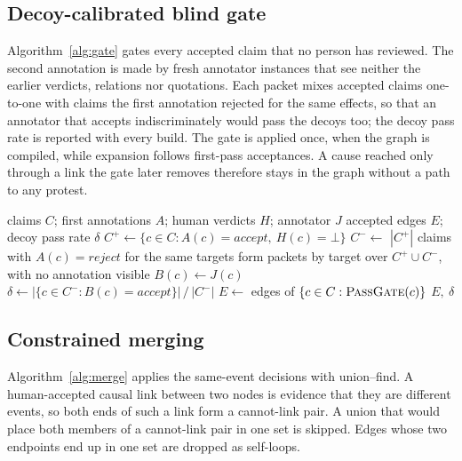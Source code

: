 \documentclass[pdflatex,sn-basic,lineno]{sn-jnl}
\theoremstyle{thmstylethree}
\theoremstyle{thmstyleone}
\begin{document}
\subsection{Decoy-calibrated blind gate}
Algorithm~\ref{alg:gate} gates every accepted claim that no person has reviewed. The second
annotation is made by fresh annotator instances that see neither the earlier verdicts, relations
nor quotations. Each packet mixes accepted claims one-to-one with claims the first annotation
rejected for the same effects, so that an annotator that accepts indiscriminately would pass the
decoys too; the decoy pass rate is reported with every build. The
gate is applied once, when the graph is compiled, while expansion follows first-pass acceptances.
A cause reached only through a link the gate later removes therefore stays in the graph without a
path to any protest.

\begin{algorithm}[!htbp]
\caption{\textsc{BlindGate}: second annotation calibrated with decoys}
\label{alg:gate}
\small
\begin{algorithmic}[1]
\Require claims $C$; first annotations $A$; human verdicts $H$; annotator $J$
\Ensure accepted edges $E$; decoy pass rate $\delta$
\State $C^+ \gets \{c\in C : A(c)=\textit{accept},\ H(c)=\bot\}$
\State $C^- \gets$ $|C^+|$ claims with $A(c)=\textit{reject}$ for the same targets 
\State form packets by target over $C^+\cup C^-$, with no annotation visible
    \State $B(c)\gets J(c)$ 
  \EndFor
\EndFor
\State $\delta \gets |\{c\in C^- : B(c)=\textit{accept}\}| \,/\, |C^-|$
\State $E \gets$ edges of $\{c\in C : \textsc{PassGate}(c)\}$ 
\State \Return $E,\ \delta$
\end{algorithmic}
\end{algorithm}

\subsection{Constrained merging}
Algorithm~\ref{alg:merge} applies the same-event decisions with union--find. A human-accepted causal
link between two nodes is evidence that they are different events, so both ends of such a link form
a cannot-link pair. A union that would place both members of a cannot-link pair in one set is
skipped. Edges whose two endpoints end up in one set are dropped as self-loops.
\end{document}

